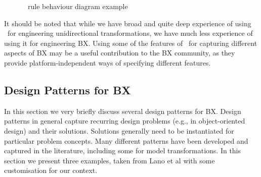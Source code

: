  \begin{figure}[htbp]
\caption{\transml\ rule behaviour diagram example \cite{GuerraLKPS13}}
\label{fig:transml-rule-behaviour-example}
\end{figure}

It should be noted that while we have broad and quite deep experience of using \transml\ for engineering unidirectional transformations, we have much less experience of using it for engineering BX. Using some of the features of \transml\ for capturing different aspects of BX may be a useful contribution to the BX community, as they provide platform-independent ways of specifying different features.

\subsection{Design Patterns for BX}
In this section we very briefly discuss several design patterns \cite{Gof1995} for BX. Design patterns in general capture recurring design problems (e.g., in object-oriented design) and their solutions. Solutions generally need to be instantiated for particular problem concepts. Many different patterns have been developed and captured in the literature, including some for model transformations. In this section we present three examples, taken from Lano et al \cite{LanoKR14} with some customisation for our context.

